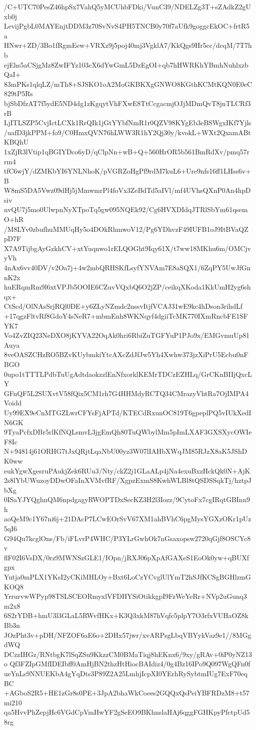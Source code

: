 /C+UTC70PesZ46hpSx7VahQ5yMCUhbFDki/VunC39/NDELZg3T+sZAdkZ2gUxb0j
LevijPgbL0MAYEnjtDDM3z70SvNvS4PH5TNCB0y70f7aUfk9goggcEkOC+frtR5a
HNwr+ZD/3Bo1fRgmEew+VRXz9j5poj40mj3VgklA7/KkQgs9Hr5cc/dcqM/7T7hb
ejEhs5aCSjgMz8ZwIFYz103cX6dYwGmL5DzEgOI+qb7hHWRKhYBmhNuhlxzbQaI+
83mPKs1qlqLZ/mTh8+SJSKO1oA2MoGKBKXgGNWO8KGthKCMtKQN0E0eC829tP5Rs
bjSbDfzAT7f5ydE5ND4dg1zKgqytVhFXwE8TtCcgacmjOJjMDmQvT8jnTLCRf3rB
LjITLSZP5CvjIctLCXk1RrQIk1jGtYYbfNmR1r0QZV98KYgEb3eBSWgxIKf7Yjls
/uafD3jkPPM+fo9/C0HmxQVN76hLWW3R1hY2Qj30y/kvokL+WXt2QxamABtKBQhU
1xZjR3lVtip1qBGIYDco6yD/qClpNn+wB+Q+560HrOR5b561BmRdXv/pmq57rrm4
tfC6wjY/dZMKbYI6YNLNhoK/pVGRZoHgPf9rdM7kuL6+Ure9nfs16ff1LHss6v+B
W8mS5DA5Vwz09dHj5jMmwmrPl4foVx3ZeBdTd5aIVl/mf4UVhsQXnP0An4hpDsiv
nvQU7j5mo0UlwpnNyXTpoTq5gw095NQEk92/Cg6HVXDIdqJTRlSbYm61qsemO+hR
/M8LYv0zbufhuMMUqHy5o4DOkRhmwoV12/Pg6YDhvzF49IUFB1oJ9ItBVaQZpD7F
X7A9TijbgAyGzkhCV+xtYuqnwo1rELQOGht9Iqy61X/t7ww18MKhu6m/OMCjvyVh
4nAx6vv40DV/v2Oa7j+4w2mbQRHSKfLsyfYNVAm7E8aSQX1/6ZqPY5UwJfGnnK2x
huERqmRm9l6xtVPJb5OOIE6CZuvVQxbQ6O2jZP/ceikqXKoda1KkUmH2yg6shqx+
CtScd/OlNAsSrjRQl0DE+y6ZLyNZmdc2nssvItjfVCAJ31wE9kc4hDson3rihdLf
+17qgzFltvRf8GdoY4sNeR7+mbmEnh8WKNqyf4dgiiTcMK770IXmRncbFE1SFYK7
Vo4ZvZIQ23NeDXO8jKYVA22OqAk0hri6RbiZuTGFYuP1PJo9x/EMGvmuUp81Auya
8veOASZCHzRO5BZvKUybmkiYtcAXcZdJfJw5Yh4Xwhw373jzXiPrU5Ecbu0nFBGO
0upo1tTTTLPdbTuUgAdtdaokzzlEnNfxorklKEMrTDCzEZHLq/GrCKnBIIjQxcLY
GFnQF5L2SUXvtV58fQix5CM1rh7G4HHMdyRCTQ34CMrazyVhtRa7OjIMPA4Voidd
Uy99EX9eCnMTGZLwrCFYsFjAPTd/KTECdRxunOC819T6gpeplPQ5vIUkXedIN6GK
9TyaPcfxDBr5rlKfNQLsmvL3jgEmQh80TuQWbylMm5pImLXAF3GXSXycOWIeF8Ic
N+94814j61ORHG7tJxQRjtLqaNbU00yz3W07lIAHbXWqJM85RJzX8aK5JShDK0ww
eukYgwXgesruPAukjZek6RUu3/Nty/ckZ2j1GLaALp4jNa4exuBxzHckQk0N+AjK
2s8lYbUWuzoyDDwOFaInXVMvfRF/XgpzExmS8KwhWLBl8tQSDSSqkTj/hztpJbXg
0ISaYJYQghnQM6npdgagyRWOPTDxSecKZ3H2l3Iozz/9CytoFx7cgIRqtGBInn9h
aoQeM9c1Y67ni6j+21DAcP7LCwEOrSvV67XM1ahBVhC6pgMysYGXzOKr1pUz5qI6
G94Qu7kcglOns/Fb/iFLvrP4WHC/P3YLrGwhOk7nGsaxopsw2720qGjf8OSCYc8v
flF02I6VsDX/0rz9MWNSzGLE1/IOpn/jRXJ06pXpAfGAXeS1EoOk0yw+qBUXfgpx
Yutja0mPLX1YKsI2yCKiMHLOy+Bxt6LoCzYCvglUlYmT2hSJfKCSgBGHlzmGKOQ8
YrrurvwWPyp98TSLSCEORmyxlVFDHYSiOtikkgpI9FzWeYeRr+NVp2uGunq3m2x8
6S2rYDB+hmU3l3GLaL5RWvfHKx+K3Q3xkM87hVqfc5plpY7O3rfxVUHaOZ8kBb3n
JOzPht3v+pDH/NFZOF6aE6o+2DHx57jwr/xvARPsgLbqVBYykVaz9e1//8MGgdWQ
DCzzIHGz/RNtbgK7lSqZSu9KkzzCM0BMaTiqj8hEKnx6/9xy/gRAv+0iP0yNZ13o
Qf3FZIpGMfIDEIbff0AmHjBN2thzHtHiocBAIdiz4/0g4Bz16IPo9Q097WgQFn0f
ueYnLs9NNUEKbA4gYqDts3P89Z2A25LmhjIcpXI0YErhRySybtmIUg7ExF70eqBC
+AGboS2R5+HE1zGr8s0PE+3JpA2bhaWkCoees2GQQxQsPeiYBFRDzM8+t57mi210
qa5HvvPhZepjHc6VGdCpVmHwYF2gSeEO9BKhnslaHAj6qggFGHKpyPfctpUd58rg
